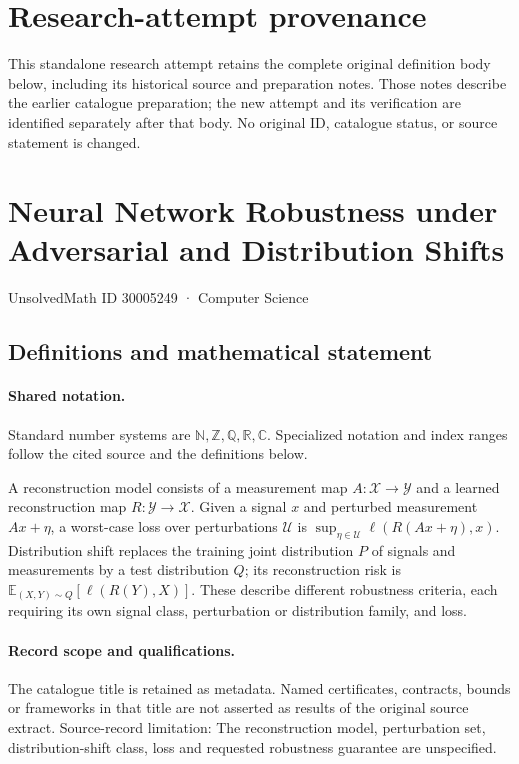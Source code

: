 \documentclass[11pt]{article}
\begin{document}
\section*{Research-attempt provenance}
This standalone research attempt retains the complete original definition body below,
including its historical source and preparation notes. Those notes describe the
earlier catalogue preparation; the new attempt and its verification are identified
separately after that body. No original ID, catalogue status, or source statement is changed.

\section{Neural Network Robustness under Adversarial and Distribution Shifts}\label{30005249}
{\small UnsolvedMath ID 30005249 · Computer Science}
\subsection{Definitions and mathematical statement}

\paragraph{Shared notation.}Standard number systems are $\mathbb N,\mathbb Z,\mathbb Q,\mathbb R,\mathbb C$. Specialized notation and index ranges follow the cited source and the definitions below.


A reconstruction model consists of a measurement map $A:\mathcal X\to\mathcal Y$ and a learned reconstruction map $R:\mathcal Y\to\mathcal X$. Given a signal $x$ and perturbed measurement $Ax+\eta$, a worst-case loss over perturbations $\mathcal U$ is $\sup_{\eta\in\mathcal U}\ell(R(Ax+\eta),x)$. Distribution shift replaces the training joint distribution $P$ of signals and measurements by a test distribution $Q$; its reconstruction risk is $\mathbb E_{(X,Y)\sim Q}[\ell(R(Y),X)]$. These describe different robustness criteria, each requiring its own signal class, perturbation or distribution family, and loss.
\paragraph{Record scope and qualifications.}
The catalogue title is retained as metadata. Named certificates, contracts, bounds or frameworks in that title are not asserted as results of the original source extract.
Source-record limitation: The reconstruction model, perturbation set, distribution-shift class, loss and requested robustness guarantee are unspecified.
\end{document}
